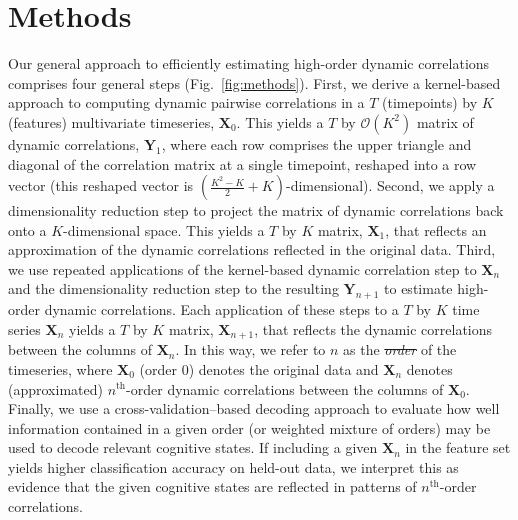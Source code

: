 \documentclass[english]{article}
\providecommand{\DIFaddtex}[1]{{\protect\color{blue}\uwave{#1}}} %
\providecommand{\DIFdeltex}[1]{{\protect\color{red}\sout{#1}}}                      %
\providecommand{\DIFaddbegin}{} %
\providecommand{\DIFaddend}{} %
\providecommand{\DIFdelbegin}{} %
\providecommand{\DIFdelend}{} %
\providecommand{\DIFadd}[1]{\texorpdfstring{\DIFaddtex{#1}}{#1}} %
\providecommand{\DIFdel}[1]{\texorpdfstring{\DIFdeltex{#1}}{}} %
\newcommand{\DIFscaledelfig}{0.5}
\newlength{\DIFdelgraphicswidth} %
\newlength{\DIFdelgraphicsheight} %
\newcommand{\DIFaddincludegraphics}[2][]{{\color{blue}\fbox{\DIFOincludegraphics[#1]{#2}}}} %
\newcommand{\DIFdelincludegraphics}[2][]{%
\sbox{\DIFdelgraphicsbox}{\DIFOincludegraphics[#1]{#2}}%
\settoboxwidth{\DIFdelgraphicswidth}{\DIFdelgraphicsbox} %
\settoboxtotalheight{\DIFdelgraphicsheight}{\DIFdelgraphicsbox} %
\scalebox{\DIFscaledelfig}{%
\parbox[b]{\DIFdelgraphicswidth}{\usebox{\DIFdelgraphicsbox}\\[-\baselineskip] \rule{\DIFdelgraphicswidth}{0em}}\llap{\resizebox{\DIFdelgraphicswidth}{\DIFdelgraphicsheight}{%
\setlength{\unitlength}{\DIFdelgraphicswidth}%
\begin{picture}(1,1)%
\thicklines\linethickness{2pt} %
{\color[rgb]{1,0,0}\put(0,0){\framebox(1,1){}}}%
{\color[rgb]{1,0,0}\put(0,0){\line( 1,1){1}}}%
{\color[rgb]{1,0,0}\put(0,1){\line(1,-1){1}}}%
\end{picture}%
}\hspace*{3pt}}} %
} %
\DeclareRobustCommand{\DIFaddbegin}{\DIFOaddbegin \let\includegraphics\DIFaddincludegraphics} %
\DeclareRobustCommand{\DIFaddend}{\DIFOaddend \let\includegraphics\DIFOincludegraphics} %
\DeclareRobustCommand{\DIFdelbegin}{\DIFOdelbegin \let\includegraphics\DIFdelincludegraphics} %
\DeclareRobustCommand{\DIFdelend}{\DIFOaddend \let\includegraphics\DIFOincludegraphics} %
\begin{document}
\section*{Methods}
Our general approach to efficiently estimating high-order dynamic
correlations comprises four general steps (Fig.~\ref{fig:methods}).
First, we derive a kernel-based approach to computing dynamic pairwise
correlations in a $T$ (timepoints) by $K$ (features) multivariate
timeseries, $\mathbf{X}_0$.  This yields a $T$ by $\mathcal{O}(K^2)$
matrix of dynamic correlations, $\mathbf{Y}_1$, where each row
comprises the upper triangle and diagonal of the correlation matrix at a single
timepoint, reshaped into a row vector (this reshaped vector is
$\left( \frac{K^2 - K}{2} + K \right)$-dimensional).  Second, we apply a dimensionality
reduction step to project the matrix of dynamic correlations back onto
a $K$-dimensional space.  This yields a $T$ by $K$ matrix,
$\mathbf{X}_1$, that reflects an approximation of the dynamic
correlations reflected in the original data.  Third, we use repeated
applications of the kernel-based dynamic correlation step to
$\mathbf{X}_n$ and the dimensionality reduction step to the resulting
$\mathbf{Y}_{n+1}$ to estimate high-order dynamic correlations.  Each
application of these steps to a $T$ by $K$ time series $\mathbf{X}_n$
yields a $T$ by $K$ matrix, $\mathbf{X}_{n+1}$, that reflects the
dynamic correlations between the columns of $\mathbf{X}_n$.  In this
way, we refer to $n$ as the \DIFdelbegin \textit{\DIFdel{order}} %
\DIFdelend \DIFaddbegin \DIFadd{order }\DIFaddend of the timeseries, where
$\mathbf{X}_0$ (order 0) denotes the original data and $\mathbf{X}_n$
denotes (approximated) $n^\mathrm{th}$-order dynamic correlations
between the columns of $\mathbf{X}_0$.  Finally, we use a
cross-validation--based decoding approach to evaluate how well
information contained in a given order (or weighted mixture of orders)
may be used to decode relevant cognitive states.  If including a given
$\mathbf{X}_n$ in the feature set yields higher classification
accuracy on held-out data, we interpret this as evidence that the
given cognitive states are reflected in patterns of
$n^\mathrm{th}$-order correlations.
\end{document}
